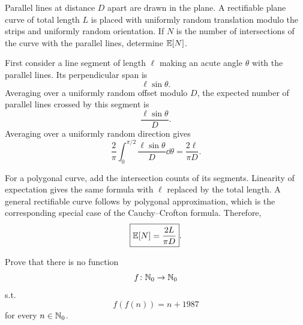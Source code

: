     \begin{expectedproblem}
        Parallel lines at distance $D$ apart are drawn in the plane. A
        rectifiable plane curve of total length $L$ is placed with uniformly
        random translation modulo the strips and uniformly random orientation.
        If $N$ is the number of intersections of the curve with the parallel
        lines, determine $\mathbb{E}[N]$.
    \end{expectedproblem}

    \begin{solution}
        First consider a line segment of length $\ell$ making an acute angle
        $\theta$ with the parallel lines. Its perpendicular span is
        \[
            \ell\sin\theta.
        \]
        Averaging over a uniformly random offset modulo $D$, the expected number
        of parallel lines crossed by this segment is
        \[
            \frac{\ell\sin\theta}{D}.
        \]
        Averaging over a uniformly random direction gives
        \[
            \frac{2}{\pi}
            \int_0^{\pi/2}
            \frac{\ell\sin\theta}{D}\dd\theta
            =
            \frac{2\ell}{\pi D}.
        \]

        For a polygonal curve, add the intersection counts of its segments.
        Linearity of expectation gives the same formula with $\ell$ replaced by
        the total length. A general rectifiable curve follows by polygonal
        approximation, which is the corresponding special case of the
        Cauchy--Crofton formula. Therefore,
        \[
            \boxed{\mathbb{E}[N]=\frac{2L}{\pi D}}.
        \]
    \end{solution}

    \begin{expectedproblem}[1987 IMO]
        Prove that there is no function
        \[
            f\colon\mathbb{N}_0\to\mathbb{N}_0
        \]
        s.t.
        \[
            f(f(n))=n+1987
        \]
        for every $n\in\mathbb{N}_0$.
    \end{expectedproblem}

